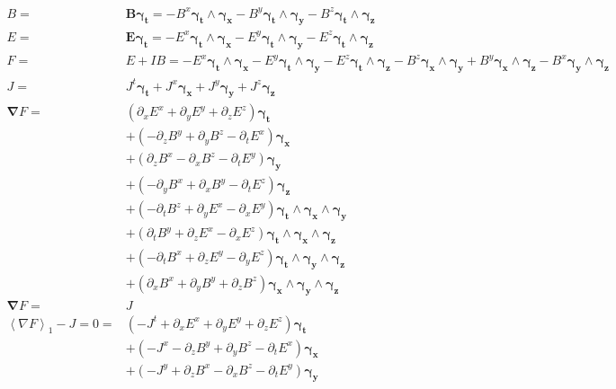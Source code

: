 \documentclass[10pt]{article}
\newcommand{\W}{\wedge}
\newcommand{\grade}[1]{\left < {#1} \right >}
\begin{document}
    \begin{align*}
    B =& \bm{B\gamma_{t}} = - B^{x}\bm{\gamma_{t}\W \gamma_{x}}- B^{y}\bm{\gamma_{t}\W \gamma_{y}}- B^{z}\bm{\gamma_{t}\W \gamma_{z}} \\
    E =& \bm{E\gamma_{t}} = - E^{x}\bm{\gamma_{t}\W \gamma_{x}}- E^{y}\bm{\gamma_{t}\W \gamma_{y}}- E^{z}\bm{\gamma_{t}\W \gamma_{z}} \\
    F =& E+IB = - E^{x}\bm{\gamma_{t}\W \gamma_{x}}- E^{y}\bm{\gamma_{t}\W \gamma_{y}}- E^{z}\bm{\gamma_{t}\W \gamma_{z}}- B^{z}\bm{\gamma_{x}\W \gamma_{y}}+B^{y}\bm{\gamma_{x}\W \gamma_{z}}- B^{x}\bm{\gamma_{y}\W \gamma_{z}} \\
    J =& J^{t}\bm{\gamma_{t}}+J^{x}\bm{\gamma_{x}}+J^{y}\bm{\gamma_{y}}+J^{z}\bm{\gamma_{z}} \\
    \bm{\nabla}  F =& \left ( \partial_{x} E^{x} + \partial_{y} E^{y} + \partial_{z} E^{z}\right ) \bm{\gamma_{t}} \\
    & +\left ( - \partial_{z} B^{y} + \partial_{y} B^{z} - \partial_{t} E^{x}\right ) \bm{\gamma_{x}} \\
    & +\left ( \partial_{z} B^{x} - \partial_{x} B^{z} - \partial_{t} E^{y}\right ) \bm{\gamma_{y}} \\
    & +\left ( - \partial_{y} B^{x} + \partial_{x} B^{y} - \partial_{t} E^{z}\right ) \bm{\gamma_{z}} \\
    & +\left ( - \partial_{t} B^{z} + \partial_{y} E^{x} - \partial_{x} E^{y}\right ) \bm{\gamma_{t}\W \gamma_{x}\W \gamma_{y}} \\
    & +\left ( \partial_{t} B^{y} + \partial_{z} E^{x} - \partial_{x} E^{z}\right ) \bm{\gamma_{t}\W \gamma_{x}\W \gamma_{z}} \\
    & +\left ( - \partial_{t} B^{x} + \partial_{z} E^{y} - \partial_{y} E^{z}\right ) \bm{\gamma_{t}\W \gamma_{y}\W \gamma_{z}} \\
    & +\left ( \partial_{x} B^{x} + \partial_{y} B^{y} + \partial_{z} B^{z}\right ) \bm{\gamma_{x}\W \gamma_{y}\W \gamma_{z}} \\
    \bm{\nabla}  F =& J \\
    \grade{\nabla F}_{1} -J = 0 =  & \left ( - J^{t} + \partial_{x} E^{x} + \partial_{y} E^{y} + \partial_{z} E^{z}\right ) \bm{\gamma_{t}} \\
    & +\left ( - J^{x} - \partial_{z} B^{y} + \partial_{y} B^{z} - \partial_{t} E^{x}\right ) \bm{\gamma_{x}} \\
    & +\left ( - J^{y} + \partial_{z} B^{x} - \partial_{x} B^{z} - \partial_{t} E^{y}\right ) \bm{\gamma_{y}} \\

\end{align*}
\end{document}
